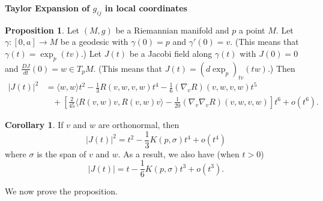 \documentclass{amsart}
\numberwithin{equation}{section}
\theoremstyle{definition}
\theoremstyle{theorem}
\newtheorem{proposition}[definition]{Proposition}
\newtheorem{corollary}[definition]{Corollary}
\begin{document}
\noindent
{\bf \large Taylor Expansion of $g_{ij}$ in local coordinates}

\begin{proposition}\label{J-norm}
Let $(M,g)$ be a Riemannian manifold and $p$ a point $M$. Let $\gamma : [0,a] \to M$ be a geodesic with $\gamma(0) = p$ and $\gamma'(0) = v$. (This means that $\gamma(t) = \exp_p(tv)$.) Let $J(t)$ be a Jacobi field along $\gamma(t)$ with $J(0)= 0$ and $\frac{DJ}{dt}(0) = w \in T_pM$. (This means that $J(t) = (d \exp_p)_{tv}(tw)$.) Then 
\begin{align*}
|J(t)|^2 &= \langle w, w \rangle t^2 - \frac{1}{3} R(v,w,v,w)t^4 - \frac{1}{6} (\nabla_v R)(v,w,v,w) t^5 \\
&\;\;\; + \left[\frac{2}{45} \langle R(v,w)v, R(v,w)v \rangle - \frac{1}{20} (\nabla_v \nabla_v R)(v,w,v,w)\right] t^6 + o(t^6).
\end{align*}
\end{proposition}

\begin{corollary}
If $v$ and $w$ are orthonormal, then 
\[
|J(t)|^2 = t^2 - \frac{1}{3} K(p,\sigma)t^4 + o(t^4)
\]
where $\sigma$ is the span of $v$ and $w$. As a result, we also have (when $t>0$)
\[
|J(t)| = t - \frac{1}{6}K(p, \sigma)t^3 + o(t^3).
\]
\end{corollary}

We now prove the proposition. 
\end{document}
